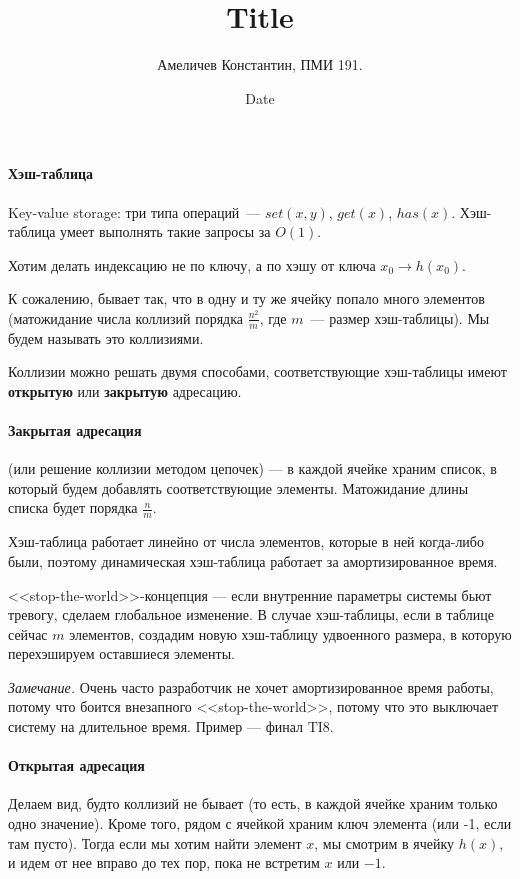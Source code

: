 \documentclass[12pt]{article}
\title{Title}
\author{Амеличев Константин, ПМИ 191.}
\date{Date}
\begin{document}
\paragraph{Хэш-таблица}
\hspace{\fill}

Key-value storage: три типа операций~--- $set(x, y)$, $get(x)$, $has(x)$.  Хэш-таблица умеет выполнять такие запросы за $O(1)$.

Хотим делать индексацию не по ключу, а по хэшу от ключа $x_0 \rightarrow h(x_0)$.

К сожалению, бывает так, что в одну и ту же ячейку попало много элементов (матожидание числа коллизий порядка $\frac{n^2}{m}$, где $m$~--- размер хэш-таблицы). Мы будем называть это коллизиями.

Коллизии можно решать двумя способами, соответствующие хэш-таблицы имеют \textbf{открытую} или \textbf{закрытую} адресацию.

\paragraph{Закрытая адресация} (или решение коллизии методом цепочек) --- в каждой ячейке храним список, в который будем добавлять соответствующие элементы. Матожидание длины списка будет порядка $\frac{n}{m}$.

Хэш-таблица работает линейно от числа элементов, которые в ней когда-либо были, поэтому динамическая хэш-таблица работает за амортизированное время.

<<stop-the-world>>-концепция --- если внутренние параметры системы бьют тревогу, сделаем глобальное изменение. В случае хэш-таблицы, если в таблице сейчас $m$ элементов, создадим новую хэш-таблицу удвоенного размера, в которую перехэшируем оставшиеся элементы.

\textit{Замечание.} Очень часто разработчик не хочет амортизированное время работы, потому что боится внезапного <<stop-the-world>>, потому что это выключает систему на длительное время. Пример --- финал TI8.

\paragraph{Открытая адресация}
\hspace{\fill}

Делаем вид, будто коллизий не бывает (то есть, в каждой ячейке храним только одно значение). Кроме того, рядом с ячейкой храним ключ элемента (или -1, если там пусто). Тогда если мы хотим найти элемент $x$, мы смотрим в ячейку $h(x)$, и идем от нее вправо до тех пор, пока не встретим $x$ или $-1$.
\end{document}
